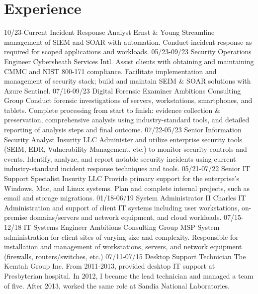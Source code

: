 \documentclass[]{twentysecondcv}
\begin{document}
\section{Experience}
\begin{twenty}
  \twentyitem
  {10/23-Current}
  {Incident Response Analyst}
  {Ernst \& Young}
  {Streamline management of SIEM and SOAR with automation. Conduct incident response
    as required for scoped applications and workloads.}
  \twentyitem
  {05/23-09/23}
  {Security Operations Engineer}
  {Cybersheath Services Intl.}
  {Assist clients with obtaining and maintaining CMMC and NIST 800-171 compliance.
    Facilitate implementation and management of security stack; build and maintain
    SEIM \& SOAR solutions with Azure Sentinel.}
  \twentyitem
  {07/16-09/23}
  {Digital Forensic Examiner}
  {Ambitions Consulting Group}
  {Conduct forensic investigations of servers, workstations, smartphones, and
    tablets. Complete processing from start to finish: evidence collection \& preservation,
    comprehensive analysis using industry-standard tools, and detailed reporting of
    analysis steps and final outcome.}
  \twentyitem
  {07/22-05/23}
  {Senior Information Security Analyst}
  {Insurity LLC}
  {Administer and utilize enterprise security tools (SEIM, EDR, Vulnerability
    Management, etc.) to monitor security controls and events. Identify, analyze,
    and report notable security incidents using current industry-standard incident
    response techniques and tools.}
  \twentyitem
  {05/21-07/22}
  {Senior IT Support Specialist}
  {Insurity LLC}
  {Provide primary support for the enterprise's Windows, Mac, and Linux systems.
    Plan and complete internal projects, such as email and storage migrations.}
  \twentyitem
  {01/18-06/19}
  {System Administrator II}
  {Charles IT}
  {Administration and support of client IT systems including  user workstations,
    on-premise domains\slash servers and network equipment, and cloud workloads.}
  \twentyitem
  {07/15-12/18}
  {IT Systems Engineer}
  {Ambitions Consulting Group}
  {MSP System administration for client sites of varying size and complexity. Responsible
    for installation and management of workstations, servers, and network equipment
    (firewalls, routers/switches, etc.)}
  \twentyitem
  {07/11-07/15}
  {Desktop Support Technician}
  {The Kemtah Group Inc.}
  {From 2011-2013, provided desktop IT support at Presbyterian hospital. In 2012,
    I became the lead technician and managed a team of five. After 2013, worked the
    same role at Sandia National Laboratories.}

\end{twenty}
\end{document}
